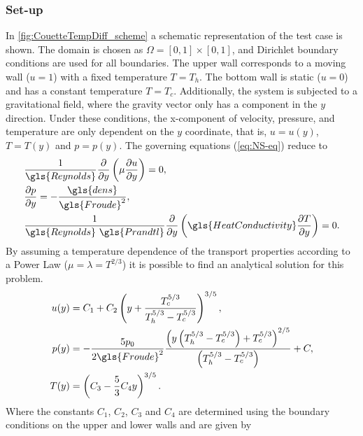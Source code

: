 \subsubsection{Set-up}
In \cref{fig:CouetteTempDiff_scheme} a schematic representation of the test case is shown. The domain is chosen as $\Omega = [0,1]\times[0,1]$, and Dirichlet boundary conditions are used for all boundaries. The upper wall corresponds to a moving wall ($u = 1$) with a fixed temperature $T=T_h$. The bottom wall is static ($u = 0$) and has a constant temperature $T = T_c$.
Additionally, the system is subjected to a gravitational field, where the gravity vector only has a component in the $y$ direction. Under these conditions, the x-component of velocity, pressure, and temperature are only dependent on the $y$ coordinate, that is, $u = u(y)$, $T = T(y)$ and $p = p(y)$. The governing equations (\cref{eq:NS-eq}) reduce to%
\begin{subequations}
    \begin{align}
    	 & \frac{1}{\gls{Reynolds}} \pfrac{ }{y}\left(\mu\pfrac{u}{y}\right) = 0,\\
    	 & \pfrac{p}{y} = -\frac{\gls{dens}}{\gls{Froude}^2},\\
    	 & \frac{1}{\gls{Reynolds}~\gls{Prandtl}} \pfrac{ }{y}\left(\gls{HeatConductivity}\pfrac{T}{y}\right) = 0.
    \end{align}\label{eq:AllCouetteEquations}
\end{subequations}
By assuming a temperature dependence of the transport properties according to a Power Law ($\mu = \lambda = T^{2/3}$) it is possible to find an analytical solution for this problem.
\begingroup
\allowdisplaybreaks
\begin{subequations}
    \begin{align}
    	u(y) & = C_1 + C_2\left(y + \frac{T_c^{5/3}}{T_h^{5/3}-T_c^{5/3}} \right)^{3/5},\\
    	p(y) & = -\frac{5p_0}{2\gls{Froude}^2}\frac{\left(y\left(T_h^{5/3}-T_c^{5/3}\right)+T_c^{5/3}\right)^{2/5}}{\left(T_h^{5/3}-T_c^{5/3}\right)}+C,\\
    	T(y) & = \left(C_3 - \frac{5}{3}C_4 y\right)^{3/5}.
    \end{align}\label{eq:AllCouetteSolutions}
\end{subequations}
\endgroup
Where the constants $C_1$, $C_2$, $C_3$ and $C_4$ are determined using the boundary conditions on the upper and lower walls and are given by
